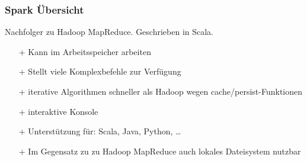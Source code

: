 \begin{frame}
    \frametitle{Spark Übersicht}
    Nachfolger zu Hadoop MapReduce. Geschrieben in Scala.
    \begin{itemize}{Vorteile gegenüber von Hadoop MapReduce:}
        \item[+] Kann im Arbeitsspeicher arbeiten %
        \item[+] Stellt viele Komplexbefehle zur Verfügung
        \item[+] iterative Algorithmen schneller als Hadoop wegen cache/persist-Funktionen
        \item[+] interaktive Konsole %
        \item[+] Unterstützung für: Scala, Java, Python, \ldots
        \item[+] Im Gegensatz zu zu Hadoop MapReduce auch lokales Dateisystem nutzbar %
    \end{itemize}
\end{frame}



